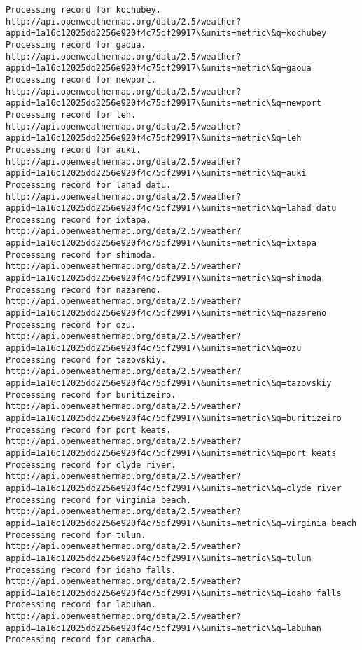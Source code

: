 \documentclass[11pt]{article}
\begin{document}
\begin{Verbatim}[commandchars=\\\{\}]
Processing record for kochubey.
http://api.openweathermap.org/data/2.5/weather?appid=1a16c12025dd2256e920f4c75df29917\&units=metric\&q=kochubey
Processing record for gaoua.
http://api.openweathermap.org/data/2.5/weather?appid=1a16c12025dd2256e920f4c75df29917\&units=metric\&q=gaoua
Processing record for newport.
http://api.openweathermap.org/data/2.5/weather?appid=1a16c12025dd2256e920f4c75df29917\&units=metric\&q=newport
Processing record for leh.
http://api.openweathermap.org/data/2.5/weather?appid=1a16c12025dd2256e920f4c75df29917\&units=metric\&q=leh
Processing record for auki.
http://api.openweathermap.org/data/2.5/weather?appid=1a16c12025dd2256e920f4c75df29917\&units=metric\&q=auki
Processing record for lahad datu.
http://api.openweathermap.org/data/2.5/weather?appid=1a16c12025dd2256e920f4c75df29917\&units=metric\&q=lahad datu
Processing record for ixtapa.
http://api.openweathermap.org/data/2.5/weather?appid=1a16c12025dd2256e920f4c75df29917\&units=metric\&q=ixtapa
Processing record for shimoda.
http://api.openweathermap.org/data/2.5/weather?appid=1a16c12025dd2256e920f4c75df29917\&units=metric\&q=shimoda
Processing record for nazareno.
http://api.openweathermap.org/data/2.5/weather?appid=1a16c12025dd2256e920f4c75df29917\&units=metric\&q=nazareno
Processing record for ozu.
http://api.openweathermap.org/data/2.5/weather?appid=1a16c12025dd2256e920f4c75df29917\&units=metric\&q=ozu
Processing record for tazovskiy.
http://api.openweathermap.org/data/2.5/weather?appid=1a16c12025dd2256e920f4c75df29917\&units=metric\&q=tazovskiy
Processing record for buritizeiro.
http://api.openweathermap.org/data/2.5/weather?appid=1a16c12025dd2256e920f4c75df29917\&units=metric\&q=buritizeiro
Processing record for port keats.
http://api.openweathermap.org/data/2.5/weather?appid=1a16c12025dd2256e920f4c75df29917\&units=metric\&q=port keats
Processing record for clyde river.
http://api.openweathermap.org/data/2.5/weather?appid=1a16c12025dd2256e920f4c75df29917\&units=metric\&q=clyde river
Processing record for virginia beach.
http://api.openweathermap.org/data/2.5/weather?appid=1a16c12025dd2256e920f4c75df29917\&units=metric\&q=virginia beach
Processing record for tulun.
http://api.openweathermap.org/data/2.5/weather?appid=1a16c12025dd2256e920f4c75df29917\&units=metric\&q=tulun
Processing record for idaho falls.
http://api.openweathermap.org/data/2.5/weather?appid=1a16c12025dd2256e920f4c75df29917\&units=metric\&q=idaho falls
Processing record for labuhan.
http://api.openweathermap.org/data/2.5/weather?appid=1a16c12025dd2256e920f4c75df29917\&units=metric\&q=labuhan
Processing record for camacha.

\end{Verbatim}
\end{document}
